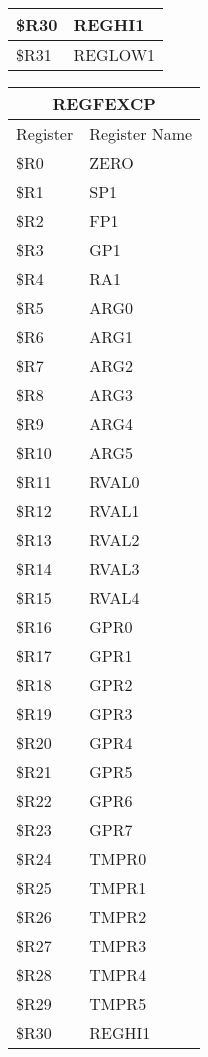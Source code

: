 \documentclass[letterpaper, 11pt]{article}
\begin{document}
\begin{figure}[!h]
{\begin{tabular}{|l|l|}
				\$R30 & REGHI1  \\ \hline
				\$R31 & REGLOW1  \\ \hline
			\end{tabular}
		}
		\hfill
		\parbox{0.2\linewidth}{
			\centering
			\fontsize{6}{8}\selectfont
			\begin{tabular}{|l|l|}
				\hline
				\multicolumn{2}{|c|}{REGFEXCP} \\
				\hline
				Register & Register Name \\ \hline
				\$R0  & ZERO \\ 	\hline
				\$R1  & SP1 \\ 	\hline
				\$R2  & FP1 \\ 	\hline
				\$R3  & GP1 \\ 	\hline
				\$R4  & RA1 \\ 	\hline
				\$R5  & ARG0 \\ 	\hline
				\$R6  & ARG1 \\ 	\hline
				\$R7  & ARG2 \\ 	\hline
				\$R8  & ARG3 \\ 	\hline
				\$R9  & ARG4 \\ 	\hline
				\$R10 & ARG5 \\ \hline
				\$R11 & RVAL0  \\ \hline
				\$R12 & RVAL1  \\ \hline
				\$R13 & RVAL2  \\ \hline
				\$R14 & RVAL3  \\ \hline
				\$R15 & RVAL4  \\ \hline
				\$R16 & GPR0  \\ \hline
				\$R17 & GPR1  \\ \hline
				\$R18 & GPR2  \\ \hline
				\$R19 & GPR3  \\ \hline
				\$R20 & GPR4  \\ \hline
				\$R21 & GPR5  \\ \hline
				\$R22 & GPR6  \\ \hline
				\$R23 & GPR7  \\ \hline
				\$R24 & TMPR0  \\ \hline
				\$R25 & TMPR1  \\ \hline
				\$R26 & TMPR2  \\ \hline
				\$R27 & TMPR3  \\ \hline
				\$R28 & TMPR4  \\ \hline
				\$R29 & TMPR5  \\ \hline
				\$R30 & REGHI1  \\ \hline

\end{tabular}}
\end{figure}
\end{document}

